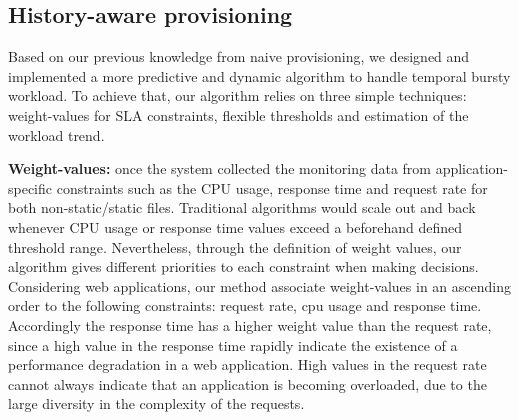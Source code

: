 






\subsection{History-aware provisioning}
Based on our previous knowledge from naive provisioning, we designed and implemented a more predictive and dynamic algorithm to handle temporal bursty workload. To achieve that, our algorithm relies on three simple techniques: weight-values for SLA constraints, flexible thresholds and  estimation of the workload trend. 


\textbf{Weight-values:} once the system collected the monitoring data from application-specific constraints such as the CPU usage, response time and request rate for both non-static/static files. Traditional algorithms would scale out and back whenever CPU usage or response time values  exceed a beforehand defined threshold range. Nevertheless,  through the definition of weight values, our algorithm gives different priorities to each constraint when making decisions. 
Considering web applications, our method associate weight-values in an ascending order to the following constraints: request rate, cpu usage and response time. Accordingly the response time has a higher weight value than the request rate, since a high value in the response time rapidly indicate the existence of a performance degradation in a web application. High values in the request rate cannot always indicate that an application is becoming overloaded, due to the large diversity in the complexity of the requests.

